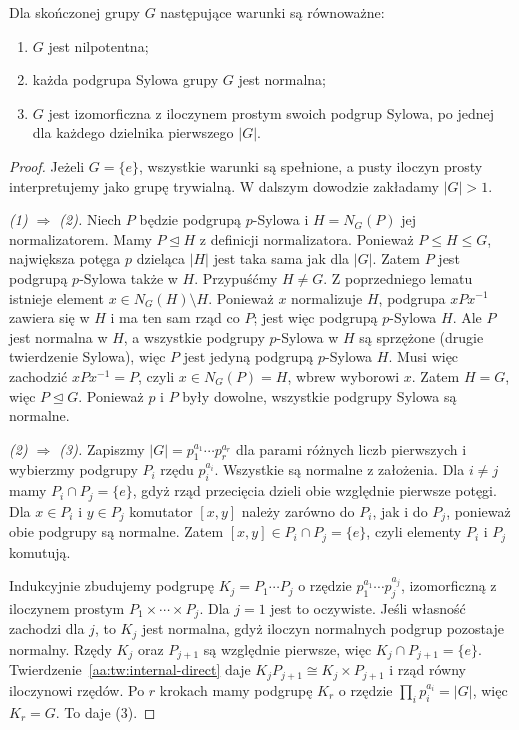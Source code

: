 \begin{twierdzenie}
\label{aa:tw:nilpotent-sylow-product}
Dla skończonej grupy $G$ następujące warunki są równoważne:
\begin{enumerate}
\item $G$ jest nilpotentna;
\item każda podgrupa Sylowa grupy $G$ jest normalna;
\item $G$ jest izomorficzna z iloczynem prostym swoich podgrup
Sylowa, po jednej dla każdego dzielnika pierwszego $|G|$.
\end{enumerate}
\end{twierdzenie}
\begin{proof}
Jeżeli $G=\{e\}$, wszystkie warunki są spełnione, a pusty
iloczyn prosty interpretujemy jako grupę trywialną.
W dalszym dowodzie zakładamy $|G|>1$.

\emph{(1) $\Rightarrow$ (2).}
Niech $P$ będzie podgrupą $p$-Sylowa i
$H=N_G(P)$ jej normalizatorem.
Mamy $P\trianglelefteq H$ z definicji normalizatora.
Ponieważ $P\le H\le G$, największa potęga $p$
dzieląca $|H|$ jest taka sama jak dla $|G|$.
Zatem $P$ jest podgrupą $p$-Sylowa także w $H$.
Przypuśćmy $H\ne G$.
Z poprzedniego lematu istnieje element
$x\in N_G(H)\setminus H$.
Ponieważ $x$ normalizuje $H$, podgrupa $xPx^{-1}$
zawiera się w $H$ i ma ten sam rząd co $P$;
jest więc podgrupą $p$-Sylowa $H$.
Ale $P$ jest normalna w $H$, a wszystkie podgrupy $p$-Sylowa
w $H$ są sprzężone (drugie twierdzenie Sylowa), więc
$P$ jest jedyną podgrupą $p$-Sylowa $H$.
Musi więc zachodzić $xPx^{-1}=P$, czyli $x\in N_G(P)=H$,
wbrew wyborowi $x$. Zatem $H=G$, więc $P\trianglelefteq G$.
Ponieważ $p$ i $P$ były dowolne, wszystkie podgrupy Sylowa
są normalne.

\emph{(2) $\Rightarrow$ (3).}
Zapiszmy $|G|=p_1^{a_1}\cdots p_r^{a_r}$ dla parami różnych
liczb pierwszych i wybierzmy podgrupy $P_i$ rzędu $p_i^{a_i}$.
Wszystkie są normalne z założenia.
Dla $i\ne j$ mamy $P_i\cap P_j=\{e\}$,
gdyż rząd przecięcia dzieli obie względnie pierwsze potęgi.
Dla $x\in P_i$ i $y\in P_j$ komutator $[x,y]$ należy
zarówno do $P_i$, jak i do $P_j$, ponieważ obie podgrupy
są normalne. Zatem $[x,y]\in P_i\cap P_j=\{e\}$,
czyli elementy $P_i$ i $P_j$ komutują.

Indukcyjnie zbudujemy podgrupę $K_j=P_1\cdots P_j$
o rzędzie $p_1^{a_1}\cdots p_j^{a_j}$, izomorficzną
z iloczynem prostym $P_1\times\cdots\times P_j$.
Dla $j=1$ jest to oczywiste.
Jeśli własność zachodzi dla $j$, to $K_j$ jest normalna,
gdyż iloczyn normalnych podgrup pozostaje normalny.
Rzędy $K_j$ oraz $P_{j+1}$ są względnie pierwsze,
więc $K_j\cap P_{j+1}=\{e\}$.
Twierdzenie~\ref{aa:tw:internal-direct} daje
$K_jP_{j+1}\cong K_j\times P_{j+1}$
i rząd równy iloczynowi rzędów.
Po $r$ krokach mamy podgrupę $K_r$ o rzędzie
$\prod_i p_i^{a_i}=|G|$, więc $K_r=G$.
To daje (3).


\end{proof}
